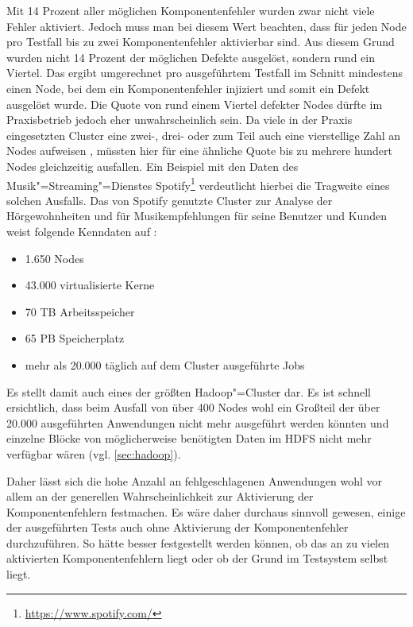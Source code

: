 Mit 14 Prozent aller möglichen Komponentenfehler wurden zwar nicht viele Fehler aktiviert.
Jedoch muss man bei diesem Wert beachten, dass für jeden Node pro Testfall bis zu zwei Komponentenfehler aktivierbar sind.
Aus diesem Grund wurden nicht 14 Prozent der möglichen Defekte ausgelöst, sondern rund ein Viertel.
Das ergibt umgerechnet pro ausgeführtem Testfall im Schnitt mindestens einen Node, bei dem ein Komponentenfehler injiziert und somit ein Defekt ausgelöst wurde.
Die Quote von rund einem Viertel defekter Nodes dürfte im Praxisbetrieb jedoch eher unwahrscheinlich sein.
Da viele in der Praxis eingesetzten Cluster eine zwei-, drei- oder zum Teil auch eine vierstellige Zahl an Nodes aufweisen \cite{PoweredByHadoop}, müssten hier für eine ähnliche Quote bis zu mehrere hundert Nodes gleichzeitig ausfallen.
Ein Beispiel mit den Daten des Musik"=Streaming"=Dienstes Spotify\footnote{\url{https://www.spotify.com/}} verdeutlicht hierbei die Tragweite eines solchen Ausfalls.
Das von Spotify genutzte Cluster zur Analyse der Hörgewohnheiten und für Musikempfehlungen für seine Benutzer und Kunden weist folgende Kenndaten auf \cite{PoweredByHadoop}:

\begin{itemize}
    \item 1.650 Nodes
    \item 43.000 virtualisierte Kerne
    \item 70 TB Arbeitsspeicher
    \item 65 PB Speicherplatz
    \item mehr als 20.000 täglich auf dem Cluster ausgeführte Jobs
\end{itemize}

Es stellt damit auch eines der größten Hadoop"=Cluster dar.
Es ist schnell ersichtlich, dass beim Ausfall von über 400 Nodes wohl ein Großteil der über 20.000 ausgeführten Anwendungen nicht mehr ausgeführt werden könnten und einzelne Blöcke von möglicherweise benötigten Daten im \gls{HDFS} nicht mehr verfügbar wären (vgl. \cref{sec:hadoop}).

Daher lässt sich die hohe Anzahl an fehlgeschlagenen Anwendungen wohl vor allem an der generellen Wahrscheinlichkeit zur Aktivierung der Komponentenfehlern festmachen.
Es wäre daher durchaus sinnvoll gewesen, einige der ausgeführten Tests auch ohne Aktivierung der Komponentenfehler durchzuführen.
So hätte besser festgestellt werden können, ob das an zu vielen aktivierten Komponentenfehlern liegt oder ob der Grund im Testsystem selbst liegt.

